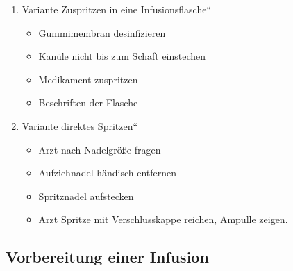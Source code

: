 \begin{enumerate}
\begin{itemize}
        \item Arzt das Medikament \"ubergeben, Ampulle zeigen.
        \item Wird das Medikamen nicht sofort verwendet spritze mit roten
        Stoppel verschliessen und Ampulle ankleben.
    \end{itemize}
    \item Variante {\quotedblbase}Zuspritzen in eine
    Infusionsflasche{\textquotedblleft}
    \begin{itemize}
        \item Gummimembran desinfizieren
        \item Kan\"ule nicht bis zum Schaft einstechen
        \item Medikament zuspritzen
        \item Beschriften der Flasche
    \end{itemize}
    \item Variante {\quotedblbase}direktes Spritzen{\textquotedblleft}
    \begin{itemize}
        \item Arzt nach Nadelgr\"o{\ss}e fragen
        \item Aufziehnadel h\"andisch entfernen
        \item Spritznadel aufstecken
        \item Arzt Spritze mit Verschlusskappe reichen, Ampulle zeigen.
    \end{itemize}
\end{enumerate}

\subsection{Vorbereitung einer Infusion}


